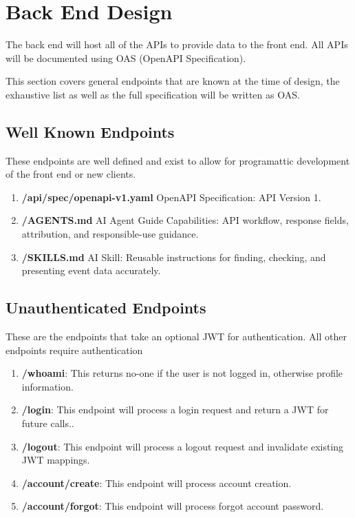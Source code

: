 \newpage %
\section{Back End Design}
The back end will host all of the APIs to provide data to the front end.
All APIs will be documented using OAS (OpenAPI Specification).

This section covers general endpoints that are known at the time of design, the exhaustive list as well as the full specification will be written as OAS.

    \subsection{Well Known Endpoints}
        These endpoints are well defined and exist to allow for programattic development of the front end or new clients.

        \begin{enumerate}[leftmargin=3\parindent]
            \item \textbf{/api/spec/openapi-v1.yaml} OpenAPI Specification: API Version 1.
            \item \textbf{/AGENTS.md} AI Agent Guide Capabilities: API workflow, response fields, attribution, and responsible-use guidance.
            \item \textbf{/SKILLS.md} AI Skill: Reusable instructions for finding, checking, and presenting event data accurately.
        \end{enumerate}

    \subsection{Unauthenticated Endpoints}
        These are the endpoints that take an optional JWT for authentication.
        All other endpoints require authentication

        \begin{enumerate}[leftmargin=3\parindent]
            \item \textbf{/whoami}: This returns no-one if the user is not logged in, otherwise profile information.
            \item \textbf{/login}: This endpoint will process a login request and return a JWT for future calls..
            \item \textbf{/logout}: This endpoint will process a logout request and invalidate existing JWT mappings.
            \item \textbf{/account/create}: This endpoint will process account creation.
            \item \textbf{/account/forgot}: This endpoint will process forgot account password.
        \end{enumerate}

